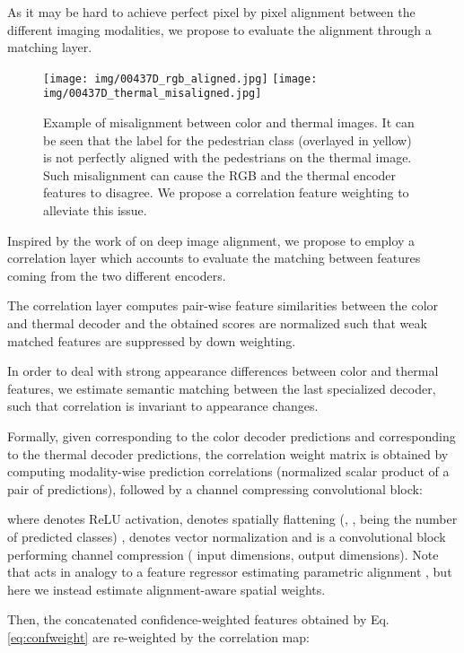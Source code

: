 \documentclass[10pt,twocolumn,letterpaper]{article}
\begin{document}
As it may be hard to achieve perfect pixel by pixel alignment between the different imaging modalities, we propose to evaluate the alignment through a matching layer.

\begin{figure}[t]
  \texttt{[image: img/00437D\_rgb\_aligned.jpg]}
  \texttt{[image: img/00437D\_thermal\_misaligned.jpg]}
\centering
\caption{Example of misalignment between color and thermal images. It can be seen that the label for the pedestrian class (overlayed in yellow) is not perfectly aligned with the pedestrians on the thermal image. Such misalignment can cause the RGB and the thermal encoder features to disagree. We propose a correlation feature weighting to alleviate this issue.}
\label{fig:disaligned}

\end{figure}

Inspired by the work of \cite{DBLP:journals/pami/RoccoAS19} on deep image alignment,
we propose to employ a correlation layer which accounts to evaluate the matching between features coming from the two different encoders.

The correlation layer computes pair-wise feature similarities between the color and thermal decoder and the obtained scores are normalized such that weak matched features are suppressed by down weighting.

In order to deal with strong appearance differences between color and thermal features, we estimate semantic matching between the last specialized decoder, such that correlation is invariant to appearance changes.

Formally, given  corresponding to the color decoder predictions and  corresponding to the thermal decoder predictions, the correlation weight matrix  is obtained by computing modality-wise prediction correlations (normalized scalar product of a pair of predictions), followed by a channel compressing convolutional block:



\noindent where  denotes ReLU activation,  denotes spatially flattening (, ,  being the number of predicted classes) ,  denotes  vector normalization and  is a convolutional block performing channel compression ( input dimensions,  output dimensions). Note that  acts in analogy to a feature regressor estimating parametric alignment \cite{DBLP:journals/pami/RoccoAS19}, but here we instead estimate alignment-aware spatial weights. 

Then, the concatenated confidence-weighted features obtained by Eq. \ref{eq:confweight} are re-weighted by the correlation map:
\end{document}
